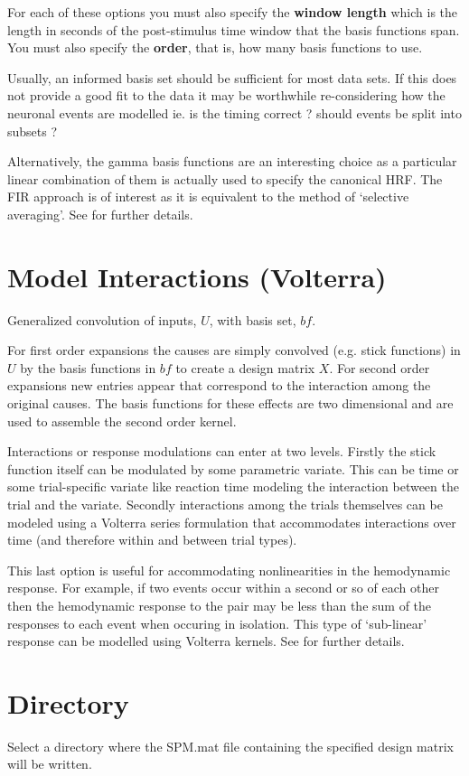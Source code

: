 \documentclass[a4paper,titlepage]{book}
\begin{document}
For each of these options you must also specify the 
{\bf window length} which is the length in seconds of the 
post-stimulus time window that the basis functions 
span. You must also specify the {\bf order}, that is, how many
basis functions to use.

Usually, an informed basis set should be sufficient for 
most data sets. If this does not provide a good fit to the 
data it may be worthwhile re-considering how the neuronal events
are modelled ie. is the timing correct ? should events be split into 
subsets ? 

Alternatively, the gamma basis functions are an interesting choice 
as a particular linear combination of them is actually used to 
specify the canonical HRF. The FIR approach is of interest as it 
is equivalent to the method of `selective averaging'. See 
\cite{rnah_conv} for further details. 

\section{Model Interactions (Volterra)}
Generalized convolution of inputs, $U$, with basis set, $bf$.

For first order expansions the causes are simply convolved (e.g. stick functions) in $U$ by the basis functions in $bf$ to create a design matrix $X$.  For second order expansions new entries appear that correspond to the interaction among the original causes. The basis functions for these effects are two dimensional and are used to assemble the second order kernel. 

Interactions or response modulations can enter at two levels.  Firstly the stick function itself can be modulated by some parametric variate. This can be time or some trial-specific variate like reaction time modeling the interaction between the trial and the variate. Secondly interactions among the trials themselves can be modeled using a Volterra series formulation that accommodates interactions over time (and therefore within and between trial types). 

This last option is useful 
for accommodating nonlinearities in the hemodynamic response. For 
example, if two events occur within a 
second or so of each other then the hemodynamic response to 
the pair may be less than the sum of the responses to each event when occuring in isolation. This type of `sub-linear' response can be modelled using
Volterra kernels. See \cite{balloon} for further details.

\section{Directory}
Select a directory where the SPM.mat file containing the specified design matrix will be written.
\end{document}
